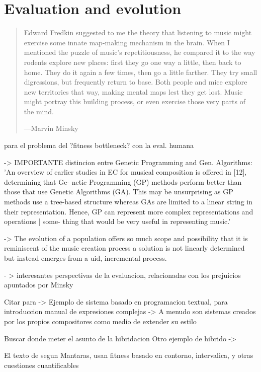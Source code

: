 \documentclass{article}
\begin{document}
\section{Evaluation and evolution}

\begin{samepage}
\begin{quotation}
Edward Fredkin suggested to me the theory that listening to music might exercise some innate map-making mechanism in the brain. When I mentioned the puzzle of music's repetitiousness, he compared it to the way rodents explore new places: first they go one way a little, then back to home. They do it again a few times, then go a little farther. They try small digressions, but frequently return to base. Both people and mice explore new territories that way, making mental maps lest they get lost. Music might portray this building process, or even exercise those very parts of the mind.

---Marvin Minsky \cite{Minsky1981}\end{quotation}
\end{samepage}


{\color{red}


\cite{Biles94genjam} para el problema del ?fitness bottleneck? con la eval. humana


\cite{Burton1999}  -> IMPORTANTE distincion entre Genetic Programming and Gen. Algorithms: 'An overview of earlier
studies in EC for musical composition is offered in [12], determining that Ge-
netic Programming (GP) methods perform better than those that use Genetic
Algorithms (GA). This may be unsurprising as GP methods use a tree-based
structure whereas GAs are limited to a linear string in their representation.
Hence, GP can represent more complex representations and operations | some-
thing that would be very useful in representing music.'





\cite{LimitHuman} -> The evolution of a population offers so much scope and possibility
that it is reminiscent of the music creation process a solution is not linearly
determined but instead emerges from a 
uid, incremental process.



\cite{DBLP:journals/aim/Minsky82} - > interesantes perspectivas de la
evaluacion, relacionadas con los prejuicios apuntados por Minsky

Citar \cite{BurtonHybrid} para
-> Ejemplo de sistema basado en programacion textual, para introduccion manual de expresiones complejas
	-> A menudo son sistemas creados por los propios compositores como medio de extender su estilo
	
	
Buscar donde meter el asunto de la hibridacion
Otro ejemplo de hibrido -> \cite{crawford2015algorithmic}

El texto de \cite{Papadopoulos98agenetic}
segun Mantaras, usan fitness basado en contorno, intervalica, y otras cuestiones cuantificables

}
\end{document}
